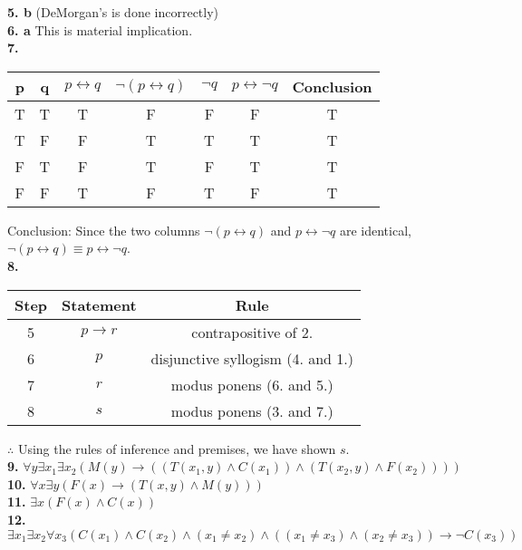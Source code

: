 \documentclass{exam}
\begin{document}
	\textbf{5. b} (DeMorgan's is done incorrectly)\\
	
	\textbf{6. a} This is material implication.\\
	
	\textbf{7. }
	
	\begin{tabular}{cc|cccc|c}
		p&q&$p \leftrightarrow q$&$\neg(p \leftrightarrow q)$&$\neg q$&$p \leftrightarrow \neg q$&Conclusion\\
		\hline
		T&T&T&F&F&F&T\\
		T&F&F&T&T&T&T\\
		F&T&F&T&F&T&T\\
		F&F&T&F&T&F&T\\
	\end{tabular}

	Conclusion: Since the two columns $\neg(p \leftrightarrow q)$ and $p \leftrightarrow \neg q$ are identical, $\neg(p \leftrightarrow q) \equiv p \leftrightarrow \neg q$.\\
	
	\textbf{8.}
	
	\begin{tabular}{c|c|c}
		Step&Statement&Rule\\
		\hline
		5&$p \rightarrow r$&contrapositive of 2.\\
		6&$p$&disjunctive syllogism (4. and 1.)\\
		7&$r$&modus ponens (6. and 5.)\\
		8&$s$&modus ponens (3. and 7.)\\
	\end{tabular}

	$\therefore$ Using the rules of inference and premises, we have shown $s$.\\
	
	\textbf{9.} $\forall y \exists x_1 \exists x_2 ( M(y) \rightarrow ( (T(x_1, y) \wedge C(x_1)) \wedge (T(x_2, y) \wedge F(x_2))  ))$\\
	
	\textbf{10.} $\forall x \exists y (F(x) \rightarrow (T(x,y) \wedge M(y)))$\\
	
	\textbf{11.} $\exists x (F(x) \wedge C(x))$\\
	
	\textbf{12.} $\exists x_1 \exists x_2  \forall x_3 ( C(x_1) \wedge C(x_2) \wedge (x_1 \neq x_2) \wedge ((x_1 \neq x_3) \wedge (x_2 \neq x_3)) \rightarrow \neg C(x_3))$
	
	
	
	
\end{document}
